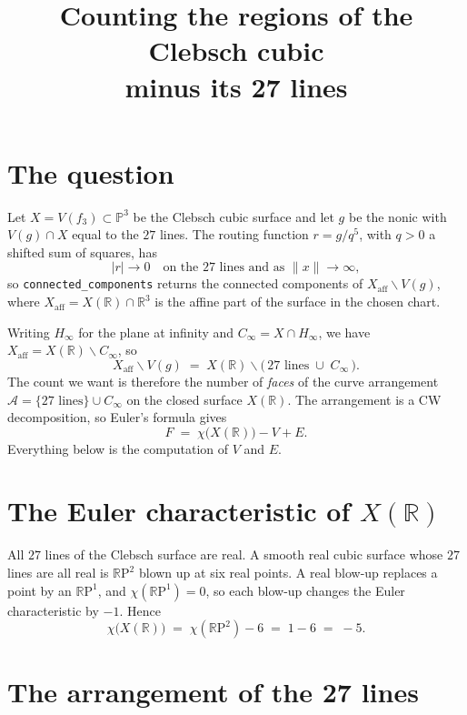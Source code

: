 \documentclass[11pt]{article}
\title{Counting the regions of the Clebsch cubic\\ minus its 27 lines}
\author{}
\date{}
\newcommand{\RP}{\mathbb{R}\mathrm{P}}
\newcommand{\R}{\mathbb{R}}
\newcommand{\Cinf}{C_\infty}
\newcommand{\Hinf}{H_\infty}
\begin{document}
\maketitle
\vspace{-3em}

\section{The question}

Let $X=V(f_3)\subset\mathbb{P}^3$ be the Clebsch cubic surface and let $g$ be the
nonic with $V(g)\cap X$ equal to the $27$ lines. The routing function
$r=g/q^5$, with $q>0$ a shifted sum of squares, has
\[
  |r|\longrightarrow 0 \quad\text{on the $27$ lines and as } \|x\|\to\infty ,
\]
so \texttt{connected\_components} returns the connected components of
$X_{\mathrm{aff}}\smallsetminus V(g)$, where $X_{\mathrm{aff}}=X(\R)\cap\R^3$ is the
affine part of the surface in the chosen chart.

Writing $\Hinf$ for the plane at infinity and $\Cinf=X\cap\Hinf$, we have
$X_{\mathrm{aff}}=X(\R)\smallsetminus\Cinf$, so
\[
  X_{\mathrm{aff}}\smallsetminus V(g)
  \;=\; X(\R)\smallsetminus\bigl(\,\text{$27$ lines}\;\cup\;\Cinf\,\bigr).
\]
The count we want is therefore the number of \emph{faces} of the curve arrangement
$\mathcal{A}=\{\text{27 lines}\}\cup\Cinf$ on the closed surface $X(\R)$. The
arrangement is a CW decomposition, so Euler's formula gives
\begin{equation}\label{eq:euler}
  F \;=\; \chi\bigl(X(\R)\bigr) - V + E .
\end{equation}
Everything below is the computation of $V$ and $E$.

\section{The Euler characteristic of \texorpdfstring{$X(\R)$}{X(R)}}

All $27$ lines of the Clebsch surface are real. A smooth real cubic surface whose
$27$ lines are all real is $\RP^2$ blown up at six real points. A real blow-up
replaces a point by an $\RP^1$, and $\chi(\RP^1)=0$, so each blow-up changes the
Euler characteristic by $-1$. Hence
\begin{equation}\label{eq:chi}
  \chi\bigl(X(\R)\bigr) \;=\; \chi(\RP^2)-6 \;=\; 1-6 \;=\; -5 .
\end{equation}

\section{The arrangement of the 27 lines}
\end{document}
